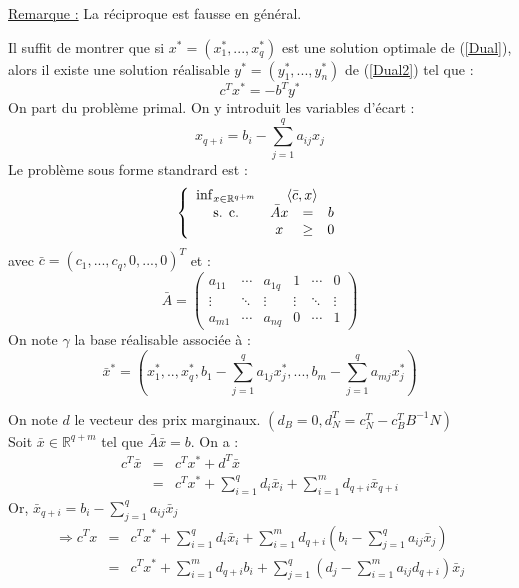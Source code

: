 
\underline{Remarque :} La réciproque est fausse en général.


\begin{dem}
Il suffit de montrer que si $x^*=(x_1^*,...,x_q^*)$ est une solution optimale de (\ref{Dual}), alors il existe une solution réalisable $y^*=(y_1^*,...,y_n^*)$ de (\ref{Dual2}) tel que : \[c^Tx^*=-b^Ty^*\]
On part du problème primal. On y introduit les variables d'écart :
	\[x_{q+i}=b_i-\sum_{j=1}^q a_{ij}x_j\]
Le problème sous forme standrard est :
 \begin{equation}
	\left\{ \begin{array}{c c c c} \inf_{x\in\mathbb{R}^{q+m}} & \multicolumn{3}{c}{\langle \bar{c},x\rangle} \\
						\text{s. c.}     & \bar{A}x &=& b \\
								& x &\geq& 0
	\end{array} \right.
\end{equation}
avec $\bar{c}=(c_1,...,c_q,0,...,0)^T$ et :
\[\bar{A}=\begin{pmatrix} a_{11} & \cdots & a_{1q} & 1 & \cdots & 0 \\
			    \vdots & \ddots & \vdots & \vdots & \ddots & \vdots \\
			    a_{m1} & \cdots & a_{nq} & 0 & \cdots & 1 \end{pmatrix}\]
On note $\gamma$ la base réalisable associée à :
	\[\bar{x}^*=\left(x_1^*,..,x^*_q,b_1-\sum_{j=1}^q a_{1j}x_j^*,..., b_m-\sum_{j=1}^q a_{mj}x_j^*\right)\]

On note $d$ le vecteur des prix marginaux. $(d_B=0, d_N^T=c_N^T-c_B^TB^{-1}N)$\\
Soit $\bar{x}\in\mathbb{R}^{q+m}$ tel que $\bar{A}\bar{x}=b$. On a : 
\begin{eqnarray*}
	c^T\bar{x}&=&c^Tx^* + d^T\bar{x} \\
		&=& c^Tx^* + \sum_{i=1}^q d_i\bar{x}_i + \sum_{i=1}^m d_{q+i}\bar{x}_{q+i}
\end{eqnarray*}
Or, $\bar{x}_{q+i}=b_i-\sum_{j=1}^q a_{ij}\bar{x}_j$
\begin{eqnarray*}
	\Rightarrow c^Tx&=&c^Tx^* + \sum_{i=1}^q d_i\bar{x}_i + \sum_{i=1}^m d_{q+i}(b_i-\sum_{j=1}^q a_{ij}\bar{x}_j) \\
			&=&c^Tx^* + \sum_{i=1}^m d_{q+i}b_i + \sum_{j=1}^q \left(d_j-\sum_{i=1}^m a_{ij}d_{q+i}\right)\bar{x}_j
\end{eqnarray*}


\end{dem}
